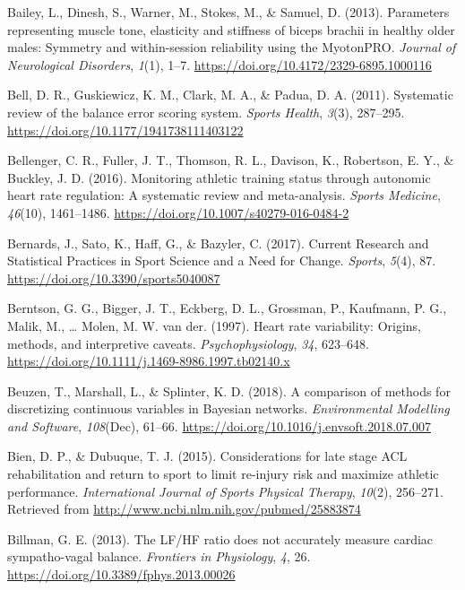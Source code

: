 \documentclass[man,floatsintext]{apa6}
\begin{document}
\leavevmode\hypertarget{ref-Bailey2013}{}%
Bailey, L., Dinesh, S., Warner, M., Stokes, M., \& Samuel, D. (2013). Parameters representing muscle tone, elasticity and stiffness of biceps brachii in healthy older males: Symmetry and within-session reliability using the MyotonPRO. \emph{Journal of Neurological Disorders}, \emph{1}(1), 1--7. \url{https://doi.org/10.4172/2329-6895.1000116}

\leavevmode\hypertarget{ref-Bell2011}{}%
Bell, D. R., Guskiewicz, K. M., Clark, M. A., \& Padua, D. A. (2011). Systematic review of the balance error scoring system. \emph{Sports Health}, \emph{3}(3), 287--295. \url{https://doi.org/10.1177/1941738111403122}

\leavevmode\hypertarget{ref-Bellenger2016}{}%
Bellenger, C. R., Fuller, J. T., Thomson, R. L., Davison, K., Robertson, E. Y., \& Buckley, J. D. (2016). Monitoring athletic training status through autonomic heart rate regulation: A systematic review and meta-analysis. \emph{Sports Medicine}, \emph{46}(10), 1461--1486. \url{https://doi.org/10.1007/s40279-016-0484-2}

\leavevmode\hypertarget{ref-Bernards2017}{}%
Bernards, J., Sato, K., Haff, G., \& Bazyler, C. (2017). Current Research and Statistical Practices in Sport Science and a Need for Change. \emph{Sports}, \emph{5}(4), 87. \url{https://doi.org/10.3390/sports5040087}

\leavevmode\hypertarget{ref-Berntson1997}{}%
Berntson, G. G., Bigger, J. T., Eckberg, D. L., Grossman, P., Kaufmann, P. G., Malik, M., \ldots{} Molen, M. W. van der. (1997). Heart rate variability: Origins, methods, and interpretive caveats. \emph{Psychophysiology}, \emph{34}, 623--648. \url{https://doi.org/10.1111/j.1469-8986.1997.tb02140.x}

\leavevmode\hypertarget{ref-Beuzen2018}{}%
Beuzen, T., Marshall, L., \& Splinter, K. D. (2018). A comparison of methods for discretizing continuous variables in Bayesian networks. \emph{Environmental Modelling and Software}, \emph{108}(Dec), 61--66. \url{https://doi.org/10.1016/j.envsoft.2018.07.007}

\leavevmode\hypertarget{ref-Bien2015}{}%
Bien, D. P., \& Dubuque, T. J. (2015). Considerations for late stage ACL rehabilitation and return to sport to limit re-injury risk and maximize athletic performance. \emph{International Journal of Sports Physical Therapy}, \emph{10}(2), 256--271. Retrieved from \url{http://www.ncbi.nlm.nih.gov/pubmed/25883874}

\leavevmode\hypertarget{ref-Billman2013}{}%
Billman, G. E. (2013). The LF/HF ratio does not accurately measure cardiac sympatho-vagal balance. \emph{Frontiers in Physiology}, \emph{4}, 26. \url{https://doi.org/10.3389/fphys.2013.00026}
\end{document}
